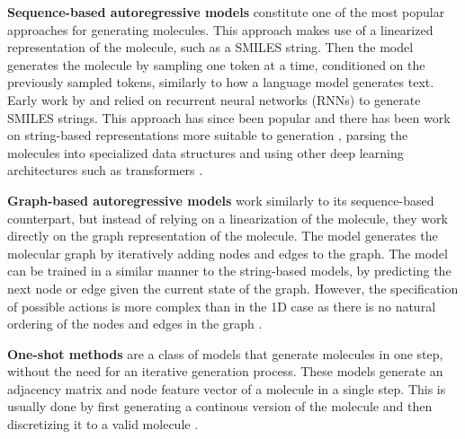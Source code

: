 \textbf{Sequence-based autoregressive models} constitute one of the most popular approaches for
generating molecules. This approach makes use of a linearized representation of the molecule, such
as a SMILES string. Then the model generates the molecule by sampling one token at a time,
conditioned on the previously sampled tokens, similarly to how a language model generates text.
Early work by \citep{seglerGeneratingFocusedMolecule2018} and
\citep{gomez-bombarelliAutomaticChemicalDesign2018} relied on recurrent neural networks (RNNs) to
generate SMILES strings. This approach has since been popular and there has been work on
string-based representations more suitable to generation
\citep{oboyleDeepSMILESAdaptationSMILES2018,krennSelfReferencingEmbeddedStrings2020,noutahiGottaBeSAFE2023},
parsing the molecules into specialized data structures
\citep{kusnerGrammarVariationalAutoencoder2017,jinJunctionTreeVariational2018} and using other deep
learning architectures such as transformers
\citep{vaswaniAttentionAllYou2017,noutahiGottaBeSAFE2023,schwallerMolecularTransformerModel2019,bagalMolGPTMolecularGeneration2022,mazuzMoleculeGenerationUsing2023}.

\textbf{Graph-based autoregressive models} work similarly to its sequence-based counterpart, but
instead of relying on a linearization of the molecule, they work directly on the graph representation
of the molecule. The model generates the molecular graph by iteratively adding nodes and edges to the
graph. The model can be trained in a similar manner to the string-based models, by
predicting the next node or edge given the current state of the graph. However, the specification of
possible actions is more complex than in the 1D case as there is no natural ordering of the
nodes and edges in the graph \citep{liuConstrainedGraphVariational2018,liLearningDeepGenerative2018,youGraphConvolutionalPolicy2019,cohen-karlikOvercomingOrderAutoregressive2024}.

\textbf{One-shot methods} are a class of models that generate molecules in one step, without the
need for an iterative generation process. These models generate an adjacency matrix and node feature
vector of a molecule in a single step. This is usually done by first generating a continous version
of the molecule and then discretizing it to a valid molecule \citep{decaoMolGANImplicitGenerative2018,madhawaGraphNVPInvertibleFlow2019}.

